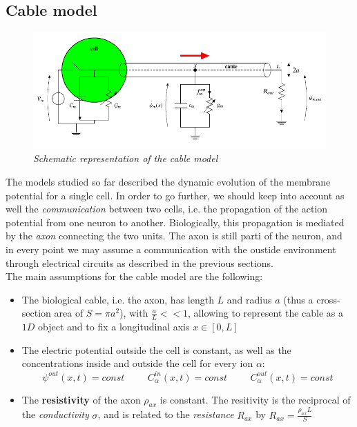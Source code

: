 \documentclass[a4paper]{article}
\begin{document}
\subsection{Cable model}

\begin{figure}[H]
	\begin{center}
		\hspace*{-0.7cm}
		\includegraphics[scale=0.7]{cable.png} 
	\end{center} 
	\caption{\textit{Schematic representation of the cable model}}
	
\end{figure}


The models studied so far described the dynamic evolution of the membrane potential  for a single cell. In order to go further, we should keep into account as well the \textit{communication} between two cells, i.e. the propagation of the action potential from one neuron to another. Biologically, this propagation is mediated by the \textit{axon} connecting the two units. The axon is still parti of the neuron, and in every point we may assume a communication with the oustide environment through electrical circuits as described in the previous sections.\\
The main assumptions for the cable model are the following:

\begin{itemize}
	
	\item The biological cable, i.e. the axon, has length $L$ and radius $a$ (thus a cross-section area of $S=\pi a^2$), with $\frac{a}{L} << 1$, allowing to represent the cable as a $1D$ object and to fix a longitudinal axis $ x \in [0,L]$
	
	\item The electric potential outside the cell is constant, as well as the concentrations inside and outside the cell for every ion $\alpha$: 
	$$ \psi^{out}(x,t) = const  \hspace{1cm} C_\alpha^{in}(x,t)  = const \hspace{1cm} C_\alpha^{out}(x,t)  = const$$
	
	\item The \textbf{resistivity} of the axon $\rho_{ax}$ is constant. The resitivity is the reciprocal of the \textit{conductivity} $\sigma$, and is related to the \textit{resistance} $R_{ax}$ by $ R_{ax} = \frac{\rho_{ax} L}{S}$
	
	
\end{itemize}
\end{document}
